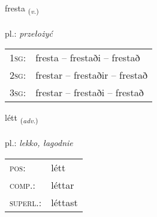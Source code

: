 \documentclass[frontgrid, backgrid]{flacards}\usepackage[]{graphicx}\usepackage[]{xcolor}
\begin{document}
\renewcommand{\flhead}{\vskip5pt \fboxsep=0pt {\small\bfseries\footnotesize Sagnorð | Verb}}
\renewcommand{\fcfoot}{\vskip5pt \fboxsep=0pt \hspace{2pt}{\small\bfseries\footnotesize 2K}}

\renewcommand{\blhead}{\vskip5pt {\small\bfseries\footnotesize Sagnorð | Verb }}
\renewcommand{\bcfoot}{\vskip5pt \hspace{2pt}{\small\bfseries\footnotesize 2K}}


{fresta \small{\textsubscript{(\textit{v.})}} \\[1ex] %
\textphonetic{[frɛsta]} \\
pl.: \emph{przełożyć} \\  [2ex]
\renewcommand*{\arraystretch}{0.8}
\begin{tabular}{p{1cm}l}
\textsc{1sg}: & fresta -- frestaði -- frestað \\ 
\textsc{2sg}: & frestar -- frestaðir -- frestað \\ 
\textsc{3sg}: & frestar -- frestaði -- frestað \\ 
\end{tabular}
}

\renewcommand{\flhead}{\vskip5pt \fboxsep=0pt {\small\bfseries\footnotesize Atviksorð | Adverb}}
\renewcommand{\fcfoot}{\vskip5pt \fboxsep=0pt \hspace{2pt}{\small\bfseries\footnotesize 2K}}

\renewcommand{\blhead}{\vskip5pt {\small\bfseries\footnotesize Atviksorð | Adverb }}
\renewcommand{\bcfoot}{\vskip5pt \hspace{2pt}{\small\bfseries\footnotesize 2K}}


{létt \small{\textsubscript{(\textit{adv.})}} \\[1ex] %
\textphonetic{[ljɛht]} \\
pl.: \emph{lekko, łagodnie} \\  [2ex]
\renewcommand*{\arraystretch}{0.8}
\begin{tabular}{ll}
\textsc{pos}: & létt \\ 
\textsc{comp.}: & léttar \\ 
\textsc{superl.}: & léttast \\
\end{tabular}
}
\end{document}

